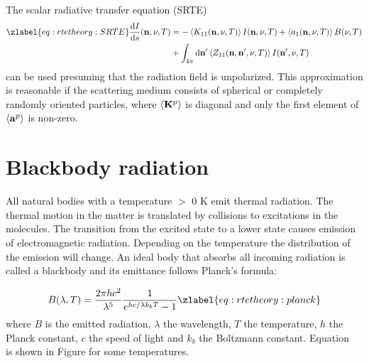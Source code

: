 The scalar radiative transfer equation (SRTE)
\begin{eqnarray}
  \zlabel{eq:rtetheory:SRTE}
  \frac{\DiffD I}{\DiffD s} (\PDir, \nu, T)& = 
  -\EnsAvr{ K_{11}(\PDir, \nu, T)} I(\PDir, \nu, T) +
  \EnsAvr{ a_1(\PDir, \nu, T)} B(\nu, T)   \nonumber\\
  &+\int_{4\pi} \DiffD \PDir' \EnsAvr{ Z_{11}(\PDir,
  \PDir', \nu, T) } I(\PDir', \nu, T)
\end{eqnarray}
can be used presuming that the radiation field is unpolarized.  This
approximation is reasonable if the scattering medium consists of
spherical or completely randomly oriented particles, where $\left\langle 
{\bf K}^p  \right\rangle$ is diagonal and only the first element of $\left\langle 
{\bf a}^p  \right\rangle$ is non-zero. 


 
\section{Blackbody radiation}
 
 All natural bodies with a temperature $>$ 0 K emit thermal radiation.
 The thermal motion in the matter is translated by collisions to
 excitations in the molecules. The transition from the excited state
 to a lower state causes emission of electromagnetic radiation.
 Depending on the temperature the distribution of the emission will
 change. An ideal body that absorbs all incoming radiation is called a
 blackbody and its emittance follows Planck's formula: 

 \begin{equation}
   B(\lambda,T) = \frac{2\pi hc^2}{\lambda^5} \frac{1}{e^{hc/\lambda k_bT}-1}
  \zlabel{eq:rtetheory:planck}
 \end{equation}
 where $B$ is the emitted radiation, $\lambda$ the wavelength, $T$ the 
 temperature, $h$ the Planck constant, $c$ the speed of light and $k_b$
 the Boltzmann constant. Equation~ is shown in Figure 
  for some temperatures.

